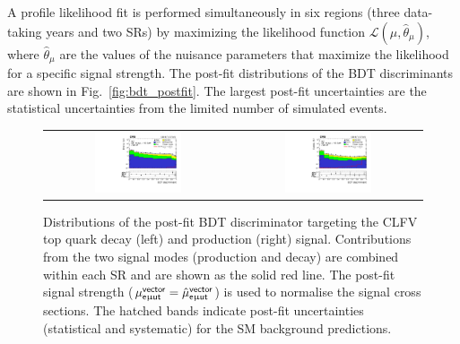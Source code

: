 A profile likelihood fit is performed simultaneously in six regions (three data-taking years and two SRs) by maximizing the likelihood function $\mathcal{L}(\mu, \hat{\theta}_{\mu})$, where $\hat{\theta}_{\mu}$ are the values of the nuisance parameters that maximize the likelihood for a specific signal strength. The post-fit distributions of the \ac{BDT} discriminants are shown in Fig.~\ref{fig:bdt_postfit}. The largest post-fit uncertainties are the statistical uncertainties from the limited number of simulated events.

\begin{figure}[tbh!]
 \begin{center}
 \begin{tabular}{cc}
 \includegraphics[width=0.48\textwidth]{figures/Part3/Results/BDT_TT_VecU}&
 \includegraphics[width=0.48\textwidth]{figures/Part3/Results/BDT_ST_VecU}\\
 \end{tabular}
 \caption{Distributions of the post-fit \ac{BDT} discriminator targeting the \ac{CLFV} top quark decay (left) and production (right) signal. Contributions from the two signal modes (production and decay) are combined within each \ac{SR} and are shown as the solid red line. The post-fit signal strength ($\mu_{\textsf{e}\upmu\textsf{{u}t}}^{\textsf{vector}}=\hat{\mu}_{\textsf{e}\upmu\textsf{{u}t}}^{\textsf{vector}}$) is used to normalise the signal cross sections. The hatched bands indicate post-fit uncertainties (statistical and systematic) for the SM background predictions.}
 \label{fig:bdt_postfit_VecU}
 \end{center}
\end{figure} 

